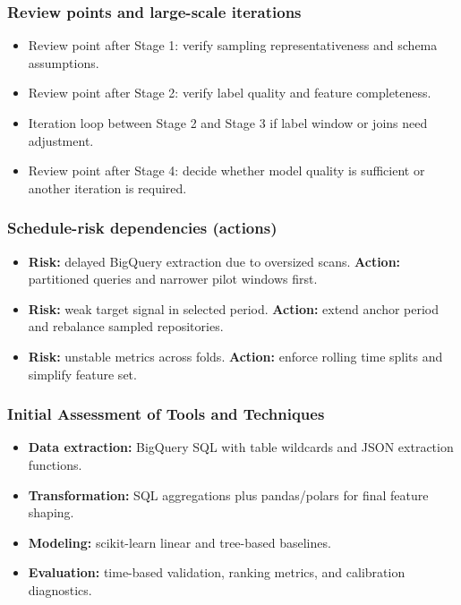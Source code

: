 \subsubsection{Review points and large-scale iterations}
\begin{itemize}
  \item Review point after Stage 1: verify sampling representativeness and schema assumptions.
  \item Review point after Stage 2: verify label quality and feature completeness.
  \item Iteration loop between Stage 2 and Stage 3 if label window or joins need adjustment.
  \item Review point after Stage 4: decide whether model quality is sufficient or another iteration is required.
\end{itemize}

\subsubsection{Schedule-risk dependencies (actions)}
\begin{itemize}
  \item \textbf{Risk:} delayed BigQuery extraction due to oversized scans. \textbf{Action:} partitioned queries and narrower pilot windows first.
  \item \textbf{Risk:} weak target signal in selected period. \textbf{Action:} extend anchor period and rebalance sampled repositories.
  \item \textbf{Risk:} unstable metrics across folds. \textbf{Action:} enforce rolling time splits and simplify feature set.
\end{itemize}

\subsubsection{Initial Assessment of Tools and Techniques}
\begin{itemize}
  \item \textbf{Data extraction:} BigQuery SQL with table wildcards and JSON extraction functions.
  \item \textbf{Transformation:} SQL aggregations plus pandas/polars for final feature shaping.
  \item \textbf{Modeling:} scikit-learn linear and tree-based baselines.
  \item \textbf{Evaluation:} time-based validation, ranking metrics, and calibration diagnostics.
\end{itemize}









